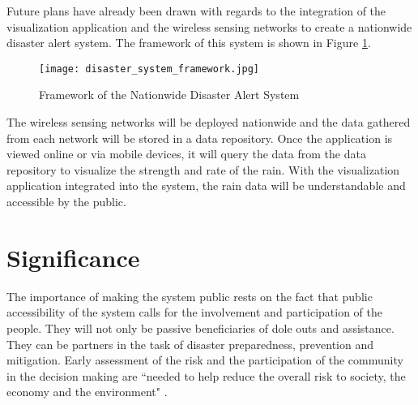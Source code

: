 \bigskip
Future plans have already been drawn with regards to the integration of the visualization application and the wireless sensing networks to create a nationwide disaster alert system. The framework of this system is shown in Figure \ref{fig:disaster_system_framework}.

\begin{figure}
	\centering
		\texttt{[image: disaster\_system\_framework.jpg]}
	\caption{Framework of the Nationwide Disaster Alert System}
	\label{fig:disaster_system_framework}
\end{figure}

\bigskip
The wireless sensing networks will be deployed nationwide and the data gathered from each network will be stored in a data repository. Once the application is viewed online or via mobile devices, it will query the data from the data repository to visualize the strength and rate of the rain. With the visualization application integrated into the system, the rain data will be understandable and accessible by the public. 

\section{Significance}

The importance of making the system public rests on the fact that public accessibility of the system calls for the involvement and participation of the people. They will not only be passive beneficiaries of dole outs and assistance. They can be partners in the task of disaster preparedness, prevention and mitigation. Early assessment of the risk and the participation of the community in the decision making are ``needed to help reduce the overall risk to society, the economy and the environment" \cite{un}.